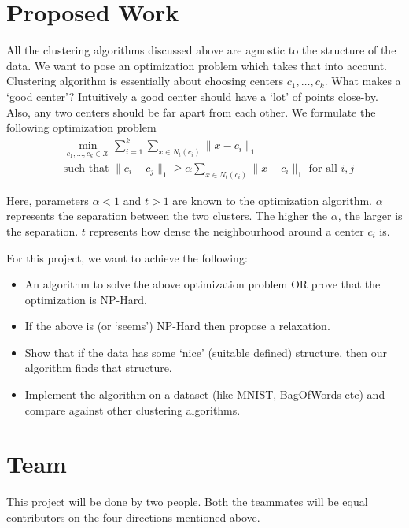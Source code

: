 \documentclass{article}
\newcommand{\mc}{\mathcal}
\begin{document}
\section{Proposed Work}
All the clustering algorithms discussed above are agnostic to the structure of the data. We want to pose an optimization problem which takes that into account. Clustering algorithm is essentially about choosing centers $c_1, \ldots, c_k$. What makes a `good center'? Intuitively a good center should have a `lot' of points close-by. Also, any two centers should be far apart from each other. We formulate the following optimization problem
\begin{align*}
	&\min_{c_1, \ldots, c_k \in \mc X} \sum_{i=1}^k \sum_{x \in N_t(c_i)} \|x-c_i\|_1 \\
	& \text{such that } \|c_i - c_j\|_1 \ge \alpha  \sum_{x \in N_t(c_i)} \|x-c_i\|_1 \text{ for all }i, j
\end{align*}

Here, parameters $\alpha < 1$ and $t > 1$ are known to the optimization algorithm. $\alpha$ represents the separation between the two clusters. The higher the $\alpha$, the larger is the separation. $t$ represents how dense the neighbourhood around a center $c_i$ is. 

For this project, we want to achieve the following:
\begin{itemize}
\item An algorithm to solve the above optimization problem OR prove that the optimization is NP-Hard. 
\item If the above is (or `seems') NP-Hard then propose a relaxation.
\item Show that if the data has some `nice' (suitable defined) structure, then our algorithm finds that structure.
\item Implement the algorithm on a dataset (like MNIST, BagOfWords etc) and compare against other clustering algorithms.
\end{itemize}


\section{Team}
This project will be done by two people. Both the teammates will be equal contributors on the four directions mentioned above.



\end{document}
